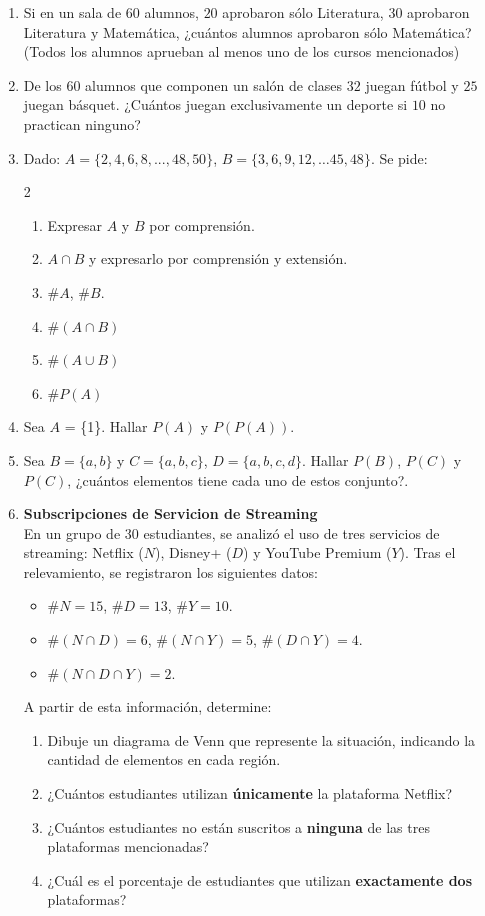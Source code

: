 \documentclass[12pt]{article}
\begin{document}
\begin{enumerate}
\item Si en un sala de $60$ alumnos, $20$ aprobaron sólo Literatura, $30$ aprobaron Literatura y Matemática, ¿cuántos alumnos aprobaron sólo Matemática? (Todos los alumnos aprueban al menos uno de los cursos
mencionados)
\item De los $60$ alumnos que componen un salón de clases $32$ juegan fútbol y $25$ juegan básquet. ¿Cuántos juegan exclusivamente un
deporte si $10$ no practican ninguno?

\item Dado: $A=\{2, 4, 6, 8, ... ,48,  50\}$, $ B=\{3,  6,  9,  12,\ldots 45,  48\}$. Se pide:
\begin{multicols}{2}
    \begin{enumerate}
    \item Expresar $A$ y $B$ por comprensión.
    \item $A\cap B$ y expresarlo por comprensión y extensión.
    \item $\#A$, $\#B$.
    \item $\#(A\cap B)$
    \item $\#(A\cup B)$
    \item $\# P(A)$
    
\end{enumerate}
\end{multicols}

\item Sea $A$ = \{1\}. Hallar $P(A)$ y $P(P(A))$. 
\item Sea $B=\{a, b\}$ y $C= \{a, b, c\}$, $D=\{a, b, c, d\}$. Hallar $P(B)$, $P(C)$ y $P(C)$, ¿cuántos elementos tiene cada uno de estos conjunto?.

\item \textbf{Subscripciones de Servicion de Streaming} \\
En un grupo de 30 estudiantes, se analizó el uso de tres servicios de streaming: Netflix ($N$), Disney+ ($D$) y YouTube Premium ($Y$). Tras el relevamiento, se registraron los siguientes datos:
\begin{itemize}
    \item $\#N = 15$, $\#D = 13$, $\#Y = 10$.
    \item $\#(N \cap D) = 6$, $\#(N \cap Y) = 5$, $\#(D \cap Y) = 4$.
    \item $\#(N \cap D \cap Y) = 2$.
\end{itemize}

A partir de esta información, determine:
\begin{enumerate}
    \item Dibuje un diagrama de Venn que represente la situación, indicando la cantidad de elementos en cada región.
    \item ¿Cuántos estudiantes utilizan \textbf{únicamente} la plataforma Netflix?
    \item ¿Cuántos estudiantes no están suscritos a \textbf{ninguna} de las tres plataformas mencionadas?
    \item ¿Cuál es el porcentaje de estudiantes que utilizan  \textbf{exactamente dos} plataformas?
\end{enumerate}


\end{enumerate}
\end{document}
